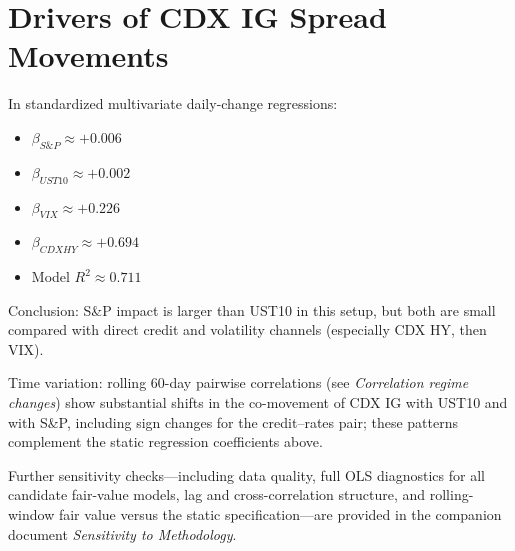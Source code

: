 \section{Drivers of CDX IG Spread Movements}
In standardized multivariate daily-change regressions:
\begin{itemize}
  \item \(\beta_{S\&P} \approx +0.006\)
  \item \(\beta_{UST10} \approx +0.002\)
  \item \(\beta_{VIX} \approx +0.226\)
  \item \(\beta_{CDXHY} \approx +0.694\)
  \item Model \(R^2 \approx 0.711\)
\end{itemize}

Conclusion: S\&P impact is larger than UST10 in this setup, but both are small compared with direct credit and volatility channels (especially CDX HY, then VIX).

Time variation: rolling 60-day pairwise correlations (see \emph{Correlation regime changes}) show substantial shifts in the co-movement of CDX IG with UST10 and with S\&P, including sign changes for the credit--rates pair; these patterns complement the static regression coefficients above.

Further sensitivity checks---including data quality, full OLS diagnostics for all candidate fair-value models, lag and cross-correlation structure, and rolling-window fair value versus the static specification---are provided in the companion document \emph{Sensitivity to Methodology}.
